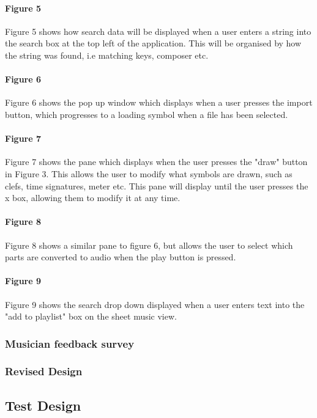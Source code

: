 \paragraph{Figure 5} Figure 5 shows how search data will be displayed when a user enters a string into the search box at the top left of the application. This will be organised by how the string was found, i.e matching keys, composer etc.

\paragraph{Figure 6} Figure 6 shows the pop up window which displays when a user presses the import button, which progresses to a loading symbol when a file has been selected.

\paragraph{Figure 7} Figure 7 shows the pane which displays when the user presses the "draw" button in Figure 3. This allows the user to modify what symbols are drawn, such as clefs, time signatures, meter etc. This pane will display until the user presses the x box, allowing them to modify it at any time.

\paragraph{Figure 8} Figure 8 shows a similar pane to figure 6, but allows the user to select which parts are converted to audio when the play button is pressed.

\paragraph{Figure 9} Figure 9 shows the search drop down displayed when a user enters text into the "add to playlist" box on the sheet music view.
\subsubsection{Musician feedback survey}
\subsubsection{Revised Design}
\subsection{Test Design}
